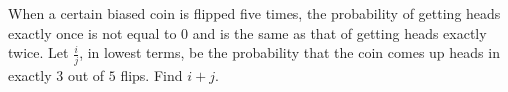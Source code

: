 When a certain biased coin is flipped five times, the probability of getting heads exactly once is not equal to $0$ and is the same as that of getting heads exactly twice. Let $\frac ij$, in lowest terms, be the probability that the coin comes up heads in exactly $3$ out of $5$ flips. Find $i+j$.